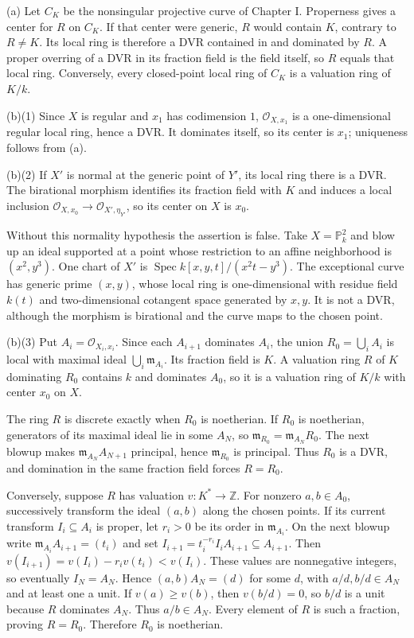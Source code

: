 (a) Let $C_K$ be the nonsingular projective curve of Chapter I. Properness gives a center for $R$ on $C_K$. If that center were generic, $R$ would contain $K$, contrary to $R\ne K$. Its local ring is therefore a DVR contained in and dominated by $R$. A proper overring of a DVR in its fraction field is the field itself, so $R$ equals that local ring. Conversely, every closed-point local ring of $C_K$ is a valuation ring of $K/k$.

(b)(1) Since $X$ is regular and $x_1$ has codimension $1$, $\mathcal O_{X,x_1}$ is a one-dimensional regular local ring, hence a DVR. It dominates itself, so its center is $x_1$; uniqueness follows from (a).

(b)(2) If $X'$ is normal at the generic point of $Y'$, its local ring there is a DVR. The birational morphism identifies its fraction field with $K$ and induces a local inclusion $\mathcal O_{X,x_0}\to\mathcal O_{X',\eta_{Y'}}$, so its center on $X$ is $x_0$.

Without this normality hypothesis the assertion is false. Take $X=\mathbb P_k^2$ and blow up an ideal supported at a point whose restriction to an affine neighborhood is $(x^2,y^3)$. One chart of $X'$ is $\operatorname{Spec}k[x,y,t]/(x^2t-y^3)$. The exceptional curve has generic prime $(x,y)$, whose local ring is one-dimensional with residue field $k(t)$ and two-dimensional cotangent space generated by $x,y$. It is not a DVR, although the morphism is birational and the curve maps to the chosen point.

(b)(3) Put $A_i=\mathcal O_{X_i,x_i}$. Since each $A_{i+1}$ dominates $A_i$, the union $R_0=\bigcup_iA_i$ is local with maximal ideal $\bigcup_i\mathfrak m_{A_i}$. Its fraction field is $K$. A valuation ring $R$ of $K$ dominating $R_0$ contains $k$ and dominates $A_0$, so it is a valuation ring of $K/k$ with center $x_0$ on $X$.

The ring $R$ is discrete exactly when $R_0$ is noetherian. If $R_0$ is noetherian, generators of its maximal ideal lie in some $A_N$, so $\mathfrak m_{R_0}=\mathfrak m_{A_N}R_0$. The next blowup makes $\mathfrak m_{A_N}A_{N+1}$ principal, hence $\mathfrak m_{R_0}$ is principal. Thus $R_0$ is a DVR, and domination in the same fraction field forces $R=R_0$.

Conversely, suppose $R$ has valuation $v:K^*\to\mathbb Z$. For nonzero $a,b\in A_0$, successively transform the ideal $(a,b)$ along the chosen points. If its current transform $I_i\subseteq A_i$ is proper, let $r_i>0$ be its order in $\mathfrak m_{A_i}$. On the next blowup write $\mathfrak m_{A_i}A_{i+1}=(t_i)$ and set $I_{i+1}=t_i^{-r_i}I_iA_{i+1}\subseteq A_{i+1}$. Then $v(I_{i+1})=v(I_i)-r_iv(t_i)<v(I_i)$. These values are nonnegative integers, so eventually $I_N=A_N$. Hence $(a,b)A_N=(d)$ for some $d$, with $a/d,b/d\in A_N$ and at least one a unit. If $v(a)\ge v(b)$, then $v(b/d)=0$, so $b/d$ is a unit because $R$ dominates $A_N$. Thus $a/b\in A_N$. Every element of $R$ is such a fraction, proving $R=R_0$. Therefore $R_0$ is noetherian.
